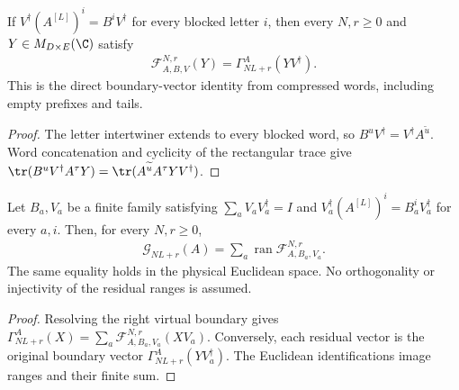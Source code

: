 \begin{lemma}
    \label{thm:blocked_residual_boundary_identity}
    \leanok
    If $V^\dagger(A^{[L]})^i=B^iV^\dagger$ for every blocked letter $i$,
    then every $N,r\geq0$ and $Y\in M_{D\times E}(\C)$ satisfy
    \begin{align}
        \mathcal F_{A,B,V}^{N,r}(Y)
        =\Gamma_{NL+r}^A(YV^\dagger).
    \end{align}
    This is the direct boundary-vector identity from compressed words,
    including empty prefixes and tails.
\end{lemma}
\begin{proof}\leanok
    The letter intertwiner extends to every blocked word, so
    $B^uV^\dagger=V^\dagger A^{\widetilde u}$. Word concatenation and
    cyclicity of the rectangular trace give
    $\tr(B^uV^\dagger A^\tau Y)
        =\tr(A^{\widetilde u}A^\tau YV^\dagger)$.
\end{proof}

\begin{lemma}
    \label{thm:blocked_residual_ground_space_resolution}
    \leanok
    Let $B_a,V_a$ be a finite family satisfying
    $\sum_aV_aV_a^\dagger=I$ and
    $V_a^\dagger(A^{[L]})^i=B_a^iV_a^\dagger$ for every $a,i$.
    Then, for every $N,r\geq0$,
    \begin{align}
        \mathcal G_{NL+r}(A)
        =\sum_a\operatorname{ran}\mathcal F_{A,B_a,V_a}^{N,r}.
    \end{align}
    The same equality holds in the physical Euclidean space. No
    orthogonality or injectivity of the residual ranges is assumed.
\end{lemma}
\begin{proof}\leanok
    Resolving the right virtual boundary gives
    $\Gamma^A_{NL+r}(X)=\sum_a\mathcal F_{A,B_a,V_a}^{N,r}(XV_a)$.
    Conversely, each residual vector is the original boundary vector
    $\Gamma^A_{NL+r}(YV_a^\dagger)$. The Euclidean identifications
    image ranges and their finite sum.
\end{proof}

